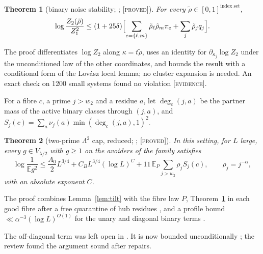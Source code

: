 \documentclass[10pt,reqno]{amsart}
\newtheorem{theorem}{Theorem}[section]
\theoremstyle{definition}
\theoremstyle{remark}
\newcommand{\E}{\mathbb E}
\newcommand{\lab}[1]{\textup{[\textsc{#1}]}}
\begin{document}
\begin{theorem}[binary noise stability; {\cite[Thm~1.4]{TW2}}; \lab{proved}]\label{thm:binaryNS}
For every $\tilde\rho\in[0,1]^{\text{index set}}$,
\[
 \log\frac{Z_2(\tilde\rho)}{Z_1^2}\leq(1+25\delta)\Bigl[\sum_{e=\{\ell,m\}}\tilde\rho_\ell\tilde\rho_m\pi_e+\sum_j\tilde\rho_jq_j\Bigr].
\]
\end{theorem}
The proof \cite[\S1]{TW2} differentiates $\log Z_2$ along $\kappa=t\tilde\rho$,
uses an identity for $\partial_{\kappa_j}\log Z_2$ under the unconditioned
law of the other coordinates, and bounds the result with a conditional
form of the Lov\'asz local lemma; no cluster expansion is needed.  An
exact check on 1200 small systems found no violation \lab{evidence}.

For a fibre $c$, a prime $j>w_2$ and a residue $a$, let $\deg_c(j,a)$ be
the partner mass of the active binary classes through $(j,a)$, and
$S_j(c)=\sum_a\nu_j(a)\min(\deg_c(j,a),1)^2$.

\begin{theorem}[two-prime $\Lambda^2$ cap, reduced; {\cite[Thm~5.1]{TW2}}; \lab{proved}]\label{thm:twoprime}
In this setting, for $L$ large, every $g\in V_{\lambda/2}$ with $g\geq1$ on
the avoiders of the family satisfies
\[
 \log\frac1{\E g^2}\leq\frac{A_0}2L^{3/4}+C_BL^{3/4}(\log L)^C
 +11\,\E_P\sum_{j>w_2}\rho_jS_j(c),\qquad\rho_j=j^{-\alpha},
\]
with an absolute exponent $C$.
\end{theorem}
The proof combines Lemma~\ref{lem:tilt} with the fibre law $P$,
Theorem~\ref{thm:binaryNS} in each good fibre after a free quarantine of
hub residues \cite[Lemma~2.2]{TW2}, and a profile bound $\ll\alpha^{-3}(\log
L)^{O(1)}$ for the unary and diagonal binary terms \cite[Lemma~4.1]{TW2}.

The off-diagonal term was left open in \cite{TW2}.  It is now bounded
unconditionally \cite{TW3}; the review \cite{TW3rev} found the argument
sound after repairs.
\end{document}
